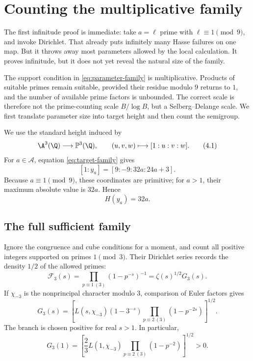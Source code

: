 \section{Counting the multiplicative family}\label{sec:counting}

The first infinitude proof is immediate: take \(a=\ell\) prime with
\(\ell\equiv1\pmod9\), and invoke Dirichlet.  That already puts infinitely
many Hasse failures on one map.  But it throws away most parameters allowed
by the local calculation.  It proves infinitude, but it does not yet reveal
the natural size of the family.

The support condition in \eqref{eq:parameter-family} is multiplicative.
Products of suitable primes remain suitable, provided their residue modulo
\(9\) returns to \(1\), and the number of available prime factors is
unbounded.  The correct scale is therefore not the prime-counting scale
\(B/\log B\), but a Selberg--Delange scale.  We first translate parameter
size into target height and then count the semigroup.

We use the standard height induced by
\[
 \A^3(\Q)\longrightarrow\mathbb P^3(\Q),\qquad
 (u,v,w)\longmapsto[1:u:v:w].
 \tag{4.1}
\]
For \(a\in\mathcal A\), equation \eqref{eq:target-family} gives
\[
 [1:y_a]=[9:-9:32a:24a+3].
 \tag{4.2}
\]
Because \(a\equiv1\pmod9\), these coordinates are primitive; for \(a>1\),
their maximum absolute value is \(32a\).  Hence
\[
 H(y_a)=32a.
 \tag{4.3}\label{eq:height}
\]

\subsection{The full sufficient family}

Ignore the congruence and cube conditions for a moment, and count all
positive integers supported on primes \(1\pmod3\).  Their Dirichlet series
records the density \(1/2\) of the allowed primes:
\[
 \mathcal F_3(s)
 =\prod_{p\equiv1\ (3)}(1-p^{-s})^{-1}
 =\zeta(s)^{1/2}G_3(s).
 \tag{4.4}\label{eq:f3}
\]
If \(\chi_{-3}\) is the nonprincipal character modulo \(3\), comparison of
Euler factors gives
\[
 G_3(s)=
 \left[
 L(s,\chi_{-3})(1-3^{-s})
 \prod_{p\equiv2\ (3)}(1-p^{-2s})
 \right]^{1/2}.
 \tag{4.5}
\]
The branch is chosen positive for real \(s>1\).  In particular,
\[
 G_3(1)=
 \left[
 \frac23L(1,\chi_{-3})
 \prod_{p\equiv2\ (3)}(1-p^{-2})
 \right]^{1/2}>0.
 \tag{4.6}
\]

